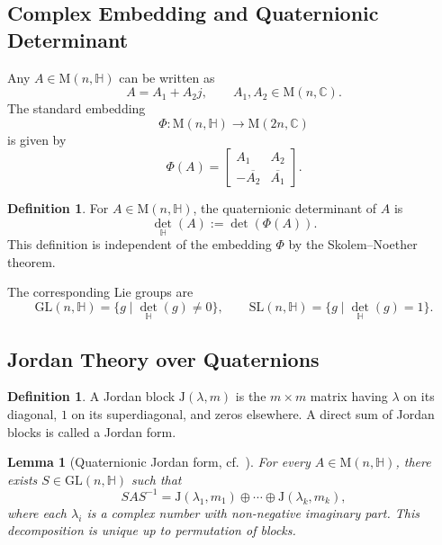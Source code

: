 \documentclass[12pt,reqno]{amsart}
\numberwithin{equation}{section}
\newtheorem{lemma}[theorem]{Lemma}
\theoremstyle{definition}
\newtheorem{definition}[theorem]{Definition}
\begin{document}
\subsection*{Complex Embedding and Quaternionic Determinant}

Any $A \in \mathrm{M}(n,\mathbb{H})$ can be written as
\[
A = A_1 + A_2 j, \qquad A_1, A_2 \in \mathrm{M}(n,\mathbb{C}).
\]
The standard embedding
\[
\Phi : \mathrm{M}(n,\mathbb{H}) \longrightarrow \mathrm{M}(2n,\mathbb{C})
\]
is given by
\begin{equation}\label{eq-embed-phi-rew}
\Phi(A) = 
\begin{bmatrix}
A_1 & A_2 \\
- \overline{A_2} & \overline{A_1}
\end{bmatrix}.
\end{equation}

\begin{definition}
For $A \in \mathrm{M}(n,\mathbb{H})$, the quaternionic determinant of $A$ is
\[
{\det}_{\mathbb{H}}(A) := \det(\Phi(A)).
\]
This definition is independent of the embedding $\Phi$ by the Skolem--Noether theorem.
\end{definition}

The corresponding Lie groups are
\[
\mathrm{GL}(n,\mathbb{H}) = \{g \mid {\det}_{\mathbb{H}}(g)\neq 0\}, \qquad
\mathrm{SL}(n,\mathbb{H}) = \{g \mid {\det}_{\mathbb{H}}(g)=1\}.
\]

\subsection*{Jordan Theory over Quaternions}

\begin{definition}{\cite{rodman}}
A Jordan block $\mathrm{J}(\lambda,m)$ is the $m \times m$ matrix having $\lambda$ on its diagonal, $1$ on its superdiagonal, and zeros elsewhere. A direct sum of Jordan blocks is called a Jordan form.
\end{definition}

\begin{lemma}[Quaternionic Jordan form, cf.~{\cite[Th.~5.5.3]{rodman}}]\label{lem-Jordan-M(n,H)-rew}
For every $A \in \mathrm{M}(n,\mathbb{H})$, there exists $S \in \mathrm{GL}(n,\mathbb{H})$ such that
\[
S A S^{-1} = \mathrm{J}(\lambda_1,m_1) \oplus \cdots \oplus \mathrm{J}(\lambda_k,m_k),
\]
where each $\lambda_i$ is a complex number with non-negative imaginary part. This decomposition is unique up to permutation of blocks.
\end{lemma}
\end{document}

